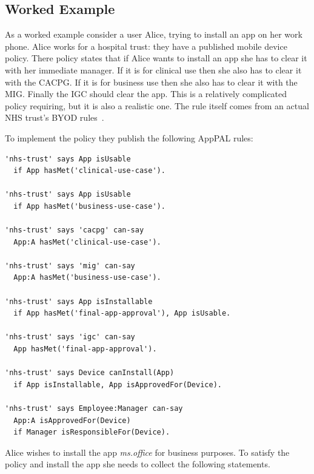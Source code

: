 \documentclass[thesis.tex]{subfiles}
\begin{document}

\subsection{Worked Example}

As a worked example consider a user Alice, trying to install an app on her work phone.
Alice works for a hospital trust: they have a published mobile device policy.%
There policy states that if Alice wants to install an app she has to clear it with her immediate manager.
If it is for clinical use then she also has to clear it with the \ac{CACPG}.
If it is for business use then she also has to clear it with the \ac{MIG}.
Finally the \ac{IGC} should clear the app.
This is a relatively complicated policy requiring, but it is also a realistic one.
The rule itself comes from an actual NHS trust's BYOD rules~\cite{kennington_mobiles_2014}.

To implement the policy they publish the following AppPAL rules:
\begin{lstlisting}
'nhs-trust' says App isUsable
  if App hasMet('clinical-use-case').

'nhs-trust' says App isUsable
  if App hasMet('business-use-case').

'nhs-trust' says 'cacpg' can-say
  App:A hasMet('clinical-use-case').

'nhs-trust' says 'mig' can-say
  App:A hasMet('business-use-case').

'nhs-trust' says App isInstallable
  if App hasMet('final-app-approval'), App isUsable.

'nhs-trust' says 'igc' can-say
  App hasMet('final-app-approval').

'nhs-trust' says Device canInstall(App)
  if App isInstallable, App isApprovedFor(Device).

'nhs-trust' says Employee:Manager can-say
  App:A isApprovedFor(Device)
  if Manager isResponsibleFor(Device).
\end{lstlisting}

Alice wishes to install the app \emph{\ttfamily ms.office} for business purposes.
To satisfy the policy and install the app she needs to collect the following statements.
\end{document}
